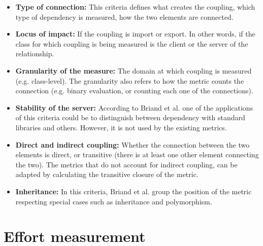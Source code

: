 \begin{itemize}
  \item \textbf{Type of connection:} This criteria defines what creates the coupling, which type of dependency is measured, how the two elements are connected.

  \item \textbf{Locus of impact:} If the coupling is import or export. In other words, if the class for which coupling is being measured is the client or the server of the relationship.

  \item \textbf{Granularity of the measure:} The domain at which coupling is measured (e.g. class-level). The granularity also refers to how the metric counts the connection (e.g. binary evaluation, or counting each one of the connections).

  \item \textbf{Stability of the server:} According to Briand et al. one of the applications of this criteria could be to distinguish between dependency with standard libraries and others. However, it is not used by the existing metrics.

  \item \textbf{Direct and indirect coupling:} Whether the connection between the two elements is direct, or transitive (there is at least one other element connecting the two). The metrics that do not account for indirect coupling, can be adapted by calculating the transitive closure of the metric.

  \item \textbf{Inheritance:} In this criteria, Briand et al. group the position of the metric respecting special cases such as inheritance and polymorphism.
\end{itemize}

\section{Effort measurement}
